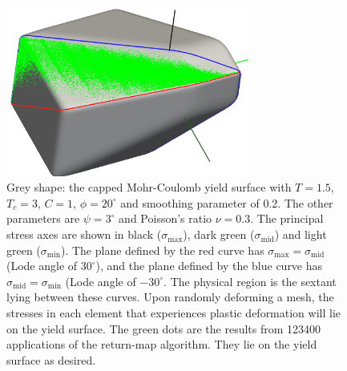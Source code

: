 \documentclass[]{scrreprt}
\newcommand{\smax}{\sigma_{\mathrm{max}}}
\newcommand{\smid}{\sigma_{\mathrm{mid}}}
\newcommand{\smin}{\sigma_{\mathrm{min}}}
\begin{document}
\begin{figure}[htb]
  \begin{center}
\includegraphics[width=8cm]{random5.eps}
\caption{Grey shape: the capped Mohr-Coulomb yield surface with
  $T=1.5$, $T_{c}=3$, $C=1$, $\phi=20^{\circ}$ and smoothing parameter
  of 0.2.  The other parameters are $\psi=3^{\circ}$ and Poisson's
  ratio $\nu=0.3$.  The principal stress axes are shown in black ($\smax$),
  dark green ($\smid$) and light green ($\smin$).  The plane defined
  by the red curve has $\smax=\smid$ (Lode angle of $30^{\circ}$), and
  the plane defined by the blue curve has $\smid=\smin$ (Lode angle of
  $-30^{\circ}$.  The physical region is the sextant lying between
  these curves.  Upon randomly deforming a mesh, the stresses in each
  element that experiences plastic deformation will lie on the yield
  surface.  The green dots are the results from 123400 applications of
  the return-map algorithm.  They lie on the yield surface as
  desired.}
\label{random5.fig}
\end{center}
\end{figure}
\end{document}
